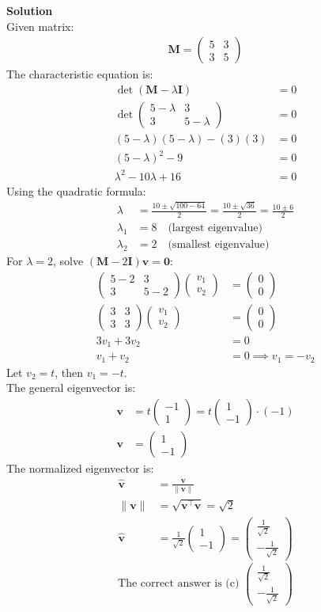\documentclass[journal]{IEEEtran}
\newcommand{\myvec}[1]{\ensuremath{\begin{pmatrix}#1\end{pmatrix}}}
\begin{document}
	\textbf{Solution}\\
	Given matrix:
	\begin{align}
		\mathbf{M} = \myvec{5 & 3\\3 & 5}
	\end{align}
	The characteristic equation is:
	\begin{align}
		\det(\mathbf{M} - \lambda\mathbf{I}) &= 0\\
		\det\myvec{5-\lambda & 3\\3 & 5-\lambda} &= 0\\
		(5-\lambda)(5-\lambda) - (3)(3) &= 0\\
		(5-\lambda)^2 - 9 &= 0\\
		\lambda^2 - 10\lambda + 16 &= 0
	\end{align}
	Using the quadratic formula:
	\begin{align}
		\lambda &= \frac{10 \pm \sqrt{100 - 64}}{2} = \frac{10 \pm \sqrt{36}}{2} = \frac{10 \pm 6}{2}\\
		\lambda_1 &= 8 \quad \text{(largest eigenvalue)}\\
		\lambda_2 &= 2 \quad \text{(smallest eigenvalue)}
	\end{align}
	For $\lambda = 2$, solve $(\mathbf{M} - 2\mathbf{I})\mathbf{v} = \mathbf{0}$:
	\begin{align}
		\myvec{5-2 & 3\\3 & 5-2}\myvec{v_1\\v_2} &= \myvec{0\\0}\\
		\myvec{3 & 3\\3 & 3}\myvec{v_1\\v_2} &= \myvec{0\\0}\\
		3v_1 + 3v_2 &= 0\\
		v_1 + v_2 &= 0 \implies v_1 = -v_2
	\end{align}
	Let $v_2 = t$, then $v_1 = -t$.\\
	The general eigenvector is:
	\begin{align}
		\mathbf{v} &= t\myvec{-1\\1} = t\myvec{1\\-1} \cdot (-1)\\
		\mathbf{v} &= \myvec{1\\-1}
	\end{align}
	The normalized eigenvector is:
	\begin{align}
		\hat{\mathbf{v}} &= \frac{\mathbf{v}}{\|\mathbf{v}\|}\\
		\|\mathbf{v}\| &= \sqrt{\mathbf{v}^\top \mathbf{v}}= \sqrt{2}\\
		\hat{\mathbf{v}} &= \frac{1}{\sqrt{2}}\myvec{1\\-1} = \myvec{\frac{1}{\sqrt{2}} \\ -\frac{1}{\sqrt{2}}}
	\end{align}
	$$\boxed{\text{The correct answer is (c) } \myvec{\frac{1}{\sqrt{2}} \\ -\frac{1}{\sqrt{2}}}}$$
	
	
	
\end{document}
